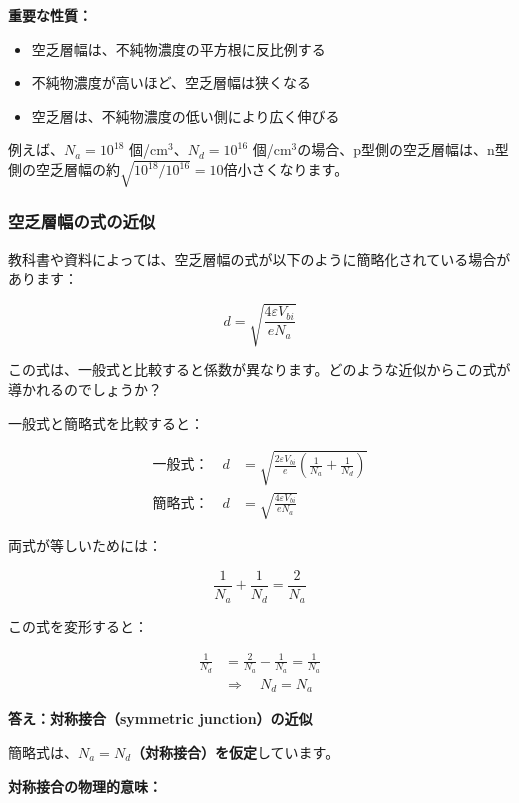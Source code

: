 \textbf{重要な性質：}
\begin{itemize}
\item 空乏層幅は、不純物濃度の平方根に反比例する
\item 不純物濃度が高いほど、空乏層幅は狭くなる
\item 空乏層は、不純物濃度の低い側により広く伸びる
\end{itemize}

例えば、$N_a = 10^{18}$ 個/cm$^3$、$N_d = 10^{16}$ 個/cm$^3$の場合、p型側の空乏層幅は、n型側の空乏層幅の約$\sqrt{10^{18}/10^{16}} = 10$倍小さくなります。

\subsubsection{空乏層幅の式の近似}

教科書や資料によっては、空乏層幅の式が以下のように簡略化されている場合があります：

\begin{equation}
d = \sqrt{\frac{4\varepsilon V_{bi}}{eN_a}}
\end{equation}

この式は、一般式と比較すると係数が異なります。どのような近似からこの式が導かれるのでしょうか？

一般式と簡略式を比較すると：

\begin{align}
\text{一般式：} \quad d &= \sqrt{\frac{2\varepsilon V_{bi}}{e}\left(\frac{1}{N_a} + \frac{1}{N_d}\right)} \\
\text{簡略式：} \quad d &= \sqrt{\frac{4\varepsilon V_{bi}}{eN_a}}
\end{align}

両式が等しいためには：

\begin{equation}
\frac{1}{N_a} + \frac{1}{N_d} = \frac{2}{N_a}
\end{equation}

この式を変形すると：

\begin{align}
\frac{1}{N_d} &= \frac{2}{N_a} - \frac{1}{N_a} = \frac{1}{N_a} \\
&\Rightarrow \quad \boxed{N_d = N_a}
\end{align}

\textbf{答え：対称接合（symmetric junction）の近似}

簡略式は、\textbf{$N_a = N_d$（対称接合）を仮定}しています。

\textbf{対称接合の物理的意味：}

